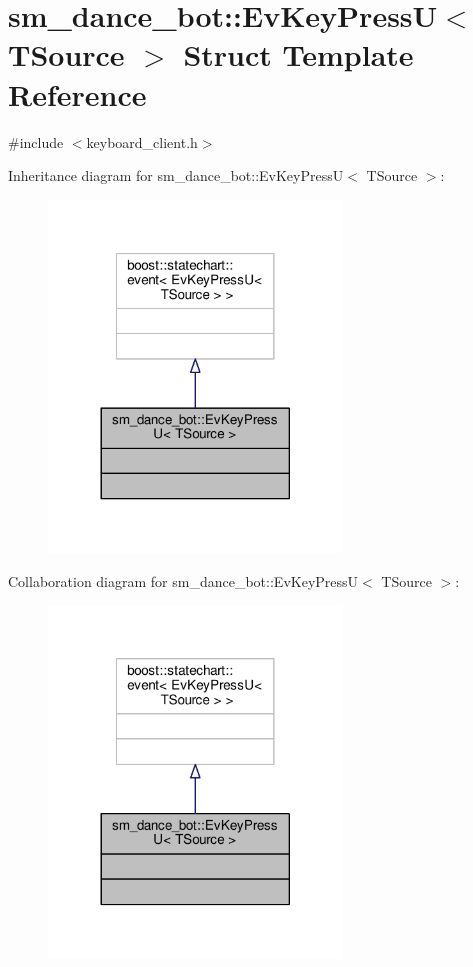 \hypertarget{structsm__dance__bot_1_1EvKeyPressU}{}\section{sm\+\_\+dance\+\_\+bot\+:\+:Ev\+Key\+PressU$<$ T\+Source $>$ Struct Template Reference}
\label{structsm__dance__bot_1_1EvKeyPressU}


{\ttfamily \#include $<$keyboard\+\_\+client.\+h$>$}



Inheritance diagram for sm\+\_\+dance\+\_\+bot\+:\+:Ev\+Key\+PressU$<$ T\+Source $>$\+:
\nopagebreak
\begin{figure}[H]
\begin{center}
\leavevmode
\includegraphics[width=221pt]{structsm__dance__bot_1_1EvKeyPressU__inherit__graph}
\end{center}
\end{figure}


Collaboration diagram for sm\+\_\+dance\+\_\+bot\+:\+:Ev\+Key\+PressU$<$ T\+Source $>$\+:
\nopagebreak
\begin{figure}[H]
\begin{center}
\leavevmode
\includegraphics[width=221pt]{structsm__dance__bot_1_1EvKeyPressU__coll__graph}
\end{center}
\end{figure}


